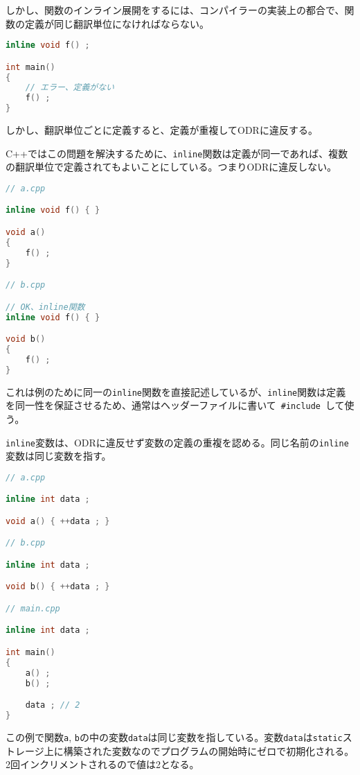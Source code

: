 しかし、関数のインライン展開をするには、コンパイラーの実装上の都合で、関数の定義が同じ翻訳単位になければならない。

\begin{lstlisting}[language=C++]
inline void f() ;

int main()
{
    // エラー、定義がない
    f() ; 
}
\end{lstlisting}

しかし、翻訳単位ごとに定義すると、定義が重複してODRに違反する。

C++ではこの問題を解決するために、\lstinline!inline!関数は定義が同一であれば、複数の翻訳単位で定義されてもよいことにしている。つまりODRに違反しない。

\begin{lstlisting}[language=C++]
// a.cpp

inline void f() { }

void a()
{
    f() ;
}

// b.cpp

// OK、inline関数
inline void f() { }

void b()
{
    f() ;
}
\end{lstlisting}

これは例のために同一の\lstinline!inline!関数を直接記述しているが、\lstinline!inline!関数は定義を同一性を保証させるため、通常はヘッダーファイルに書いて~\lstinline!#include!~して使う。

%

\lstinline!inline!変数は、ODRに違反せず変数の定義の重複を認める。同じ名前の\lstinline!inline!変数は同じ変数を指す。

\begin{lstlisting}[language=C++]
// a.cpp

inline int data ;

void a() { ++data ; }

// b.cpp

inline int data ;

void b() { ++data ; }

// main.cpp

inline int data ;

int main()
{
    a() ;
    b() ;

    data ; // 2
}
\end{lstlisting}

この例で関数\lstinline!a!,
\lstinline!b!の中の変数\lstinline!data!は同じ変数を指している。変数\lstinline!data!は\lstinline!static!ストレージ上に構築された変数なのでプログラムの開始時にゼロで初期化される。2回インクリメントされるので値は2となる。

